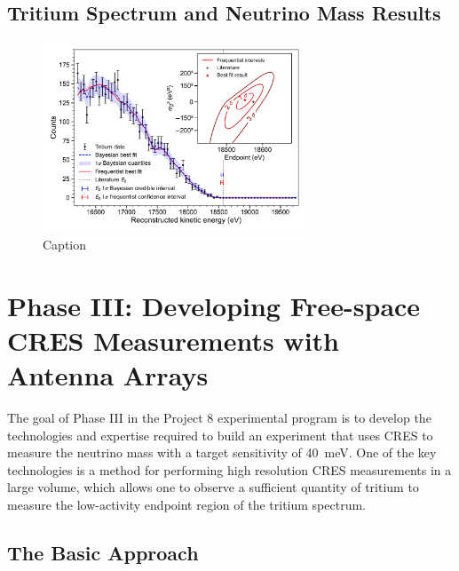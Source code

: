 \subsection{Tritium Spectrum and Neutrino Mass Results}

\begin{figure}
    \centering
    \includegraphics[width=0.7\textwidth]{figs/Chapter-3/12-03-22A_final_E0_real_data_phase_II_tritium_fit_1d.pdf}
    \caption{Caption}
    \label{fig:final_tritium_fit}
\end{figure}

\section{Phase III: Developing Free-space CRES Measurements with Antenna Arrays}

The goal of Phase III in the Project 8 experimental program is to develop the technologies and expertise required to build an experiment that uses CRES to measure the neutrino mass with a target sensitivity of 40~meV. One of the key technologies is a method for performing high resolution CRES measurements in a large volume, which allows one to observe a sufficient quantity of tritium to measure the low-activity endpoint region of the tritium spectrum. 

\subsection{The Basic Approach}

